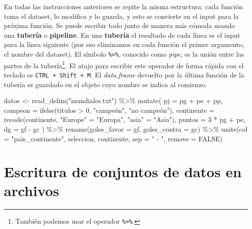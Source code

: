 \documentclass[
]{book}
\newenvironment{Shaded}{\begin{snugshade}}{\end{snugshade}}
\newcommand{\AttributeTok}[1]{\textcolor[rgb]{0.77,0.63,0.00}{#1}}
\newcommand{\ConstantTok}[1]{\textcolor[rgb]{0.00,0.00,0.00}{#1}}
\newcommand{\DecValTok}[1]{\textcolor[rgb]{0.00,0.00,0.81}{#1}}
\newcommand{\FunctionTok}[1]{\textcolor[rgb]{0.00,0.00,0.00}{#1}}
\newcommand{\NormalTok}[1]{#1}
\newcommand{\OtherTok}[1]{\textcolor[rgb]{0.56,0.35,0.01}{#1}}
\newcommand{\SpecialCharTok}[1]{\textcolor[rgb]{0.00,0.00,0.00}{#1}}
\newcommand{\StringTok}[1]{\textcolor[rgb]{0.31,0.60,0.02}{#1}}
\begin{document}
En todas las instrucciones anteriores se repite la misma estructura: cada función toma el dataset, lo modifica y lo guarda, y esto se convierte en el input para la próxima función. Se puede escribir todo junto de manera más cómoda usando una \textbf{tubería} o \textbf{pipeline}. En una \textbf{tubería} el resultado de cada línea es el input para la línea siguiente (por eso eliminamos en cada función el primer argumento, el nombre del dataset). El símbolo \texttt{\%\textgreater{}\%}, conocido como \emph{pipe}, es la unión entre las partes de la tubería\footnote{También podemos usar el operador \texttt{\%\textgreater{}\%}.}. El atajo para escribir este operador de forma rápida con el teclado es \texttt{CTRL\ +\ Shift\ +\ M}. El \emph{data.frame} devuelto por la última función de la tubería es guardado en el objeto cuyo nombre se indica al comienzo.

\begin{Shaded}
\begin{Highlighting}[]
\NormalTok{datos }\OtherTok{\textless{}{-}} 
    \FunctionTok{read\_delim}\NormalTok{(}\StringTok{"mundiales.txt"}\NormalTok{) }\SpecialCharTok{\%\textgreater{}\%} 
    \FunctionTok{mutate}\NormalTok{(}
        \AttributeTok{pj =}\NormalTok{ pg }\SpecialCharTok{+}\NormalTok{ pe }\SpecialCharTok{+}\NormalTok{ pp,}
        \AttributeTok{campeon =} \FunctionTok{ifelse}\NormalTok{(titulos }\SpecialCharTok{\textgreater{}} \DecValTok{0}\NormalTok{, }\StringTok{"campeón"}\NormalTok{, }\StringTok{"no campeón"}\NormalTok{),}
        \AttributeTok{continente =} \FunctionTok{recode}\NormalTok{(continente, }\StringTok{"Europe"} \OtherTok{=} \StringTok{"Europa"}\NormalTok{, }\StringTok{"asia"} \OtherTok{=} \StringTok{"Asia"}\NormalTok{),}
        \AttributeTok{puntos =} \DecValTok{3} \SpecialCharTok{*}\NormalTok{ pg }\SpecialCharTok{+}\NormalTok{ pe, }
        \AttributeTok{dg =}\NormalTok{ gf }\SpecialCharTok{{-}}\NormalTok{ gc}
\NormalTok{    ) }\SpecialCharTok{\%\textgreater{}\%} 
    \FunctionTok{rename}\NormalTok{(}\AttributeTok{goles\_favor =}\NormalTok{ gf, }\AttributeTok{goles\_contra =}\NormalTok{ gc) }\SpecialCharTok{\%\textgreater{}\%} 
    \FunctionTok{unite}\NormalTok{(}\AttributeTok{col =} \StringTok{"pais\_continente"}\NormalTok{, seleccion, continente, }\AttributeTok{sep =} \StringTok{" {-} "}\NormalTok{, }\AttributeTok{remove =} \ConstantTok{FALSE}\NormalTok{)}
\end{Highlighting}
\end{Shaded}

\hypertarget{escritura-de-conjuntos-de-datos-en-archivos}{%
\section{Escritura de conjuntos de datos en archivos}\label{escritura-de-conjuntos-de-datos-en-archivos}}
\end{document}

